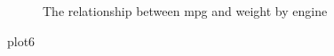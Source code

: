 \documentclass[
  man,
  floatsintext,
  longtable,
  nolmodern,
  notxfonts,
  notimes,
  colorlinks=true,linkcolor=blue,citecolor=blue,urlcolor=blue]{apa7}
\newenvironment{Shaded}{\begin{snugshade}}{\end{snugshade}}
\newcommand{\NormalTok}[1]{\textcolor[rgb]{0.00,0.23,0.31}{#1}}
\begin{document}
\begin{figure}[H]

\caption{\label{fig-optional-plot-1}The relationship between mpg and
weight by engine}


\end{figure}%

\begin{Shaded}
\begin{Highlighting}[]
\NormalTok{plot6}
\end{Highlighting}
\end{Shaded}
\end{document}
